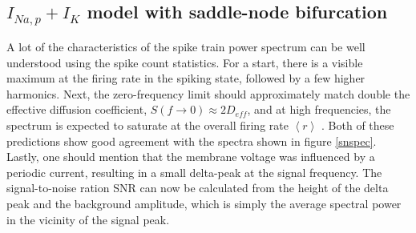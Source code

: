 \documentclass[12pt,a4paper]{article}
\begin{document}
\subsection{$I_{Na,p}+I_K$ model with saddle-node bifurcation}
A lot of the characteristics of the spike train power spectrum can be well understood using the spike count statistics. For a start, there is a visible maximum at the firing rate in the spiking state, followed by a few higher harmonics. Next, the zero-frequency limit should approximately match double the effective diffusion coefficient, $S(f\rightarrow0)\approx2D_{eff}$, and at high frequencies, the spectrum is expected to saturate at the overall firing rate $\left<r\right>$ \cite{speclim}\cite{speclim2}. Both of these predictions show good agreement with the spectra shown in figure \ref{snspec}. Lastly, one should mention that the membrane voltage was influenced by a periodic current, resulting in a small delta-peak at the signal frequency. The signal-to-noise ration SNR can now be calculated from the height of the delta peak and the background amplitude, which is simply the average spectral power in the vicinity of the signal peak.
\end{document}
